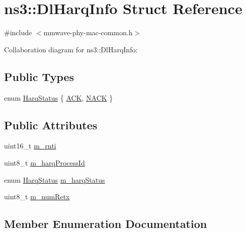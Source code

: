 \hypertarget{structns3_1_1DlHarqInfo}{}\section{ns3\+:\+:Dl\+Harq\+Info Struct Reference}
\label{structns3_1_1DlHarqInfo}


{\ttfamily \#include $<$mmwave-\/phy-\/mac-\/common.\+h$>$}



Collaboration diagram for ns3\+:\+:Dl\+Harq\+Info\+:
\subsection*{Public Types}
\begin{DoxyCompactItemize}
\item 
enum \hyperlink{structns3_1_1DlHarqInfo_a922d2bc13ae01f93cde1a8b4bfccad14}{Harq\+Status} \{ \hyperlink{structns3_1_1DlHarqInfo_a922d2bc13ae01f93cde1a8b4bfccad14a8d3ab99ad8902cfbc5929336966de3ef}{A\+CK}, 
\hyperlink{structns3_1_1DlHarqInfo_a922d2bc13ae01f93cde1a8b4bfccad14ae0560b883a5e22a4d4c40ac562e80374}{N\+A\+CK}
 \}
\end{DoxyCompactItemize}
\subsection*{Public Attributes}
\begin{DoxyCompactItemize}
\item 
uint16\+\_\+t \hyperlink{structns3_1_1DlHarqInfo_a31bb88ced4d8996f519112653146f9cb}{m\+\_\+rnti}
\item 
uint8\+\_\+t \hyperlink{structns3_1_1DlHarqInfo_ab4ee82deb856415c05052a9172deec75}{m\+\_\+harq\+Process\+Id}
\item 
enum \hyperlink{structns3_1_1DlHarqInfo_a922d2bc13ae01f93cde1a8b4bfccad14}{Harq\+Status} \hyperlink{structns3_1_1DlHarqInfo_a48de905e5f7967ab7181ab2361dc0d9e}{m\+\_\+harq\+Status}
\item 
uint8\+\_\+t \hyperlink{structns3_1_1DlHarqInfo_a2376c2dc2b319e25d240ed6158e12b6b}{m\+\_\+num\+Retx}
\end{DoxyCompactItemize}


\subsection{Member Enumeration Documentation}
